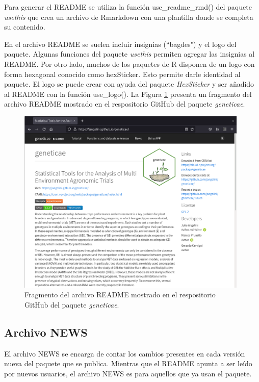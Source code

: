 Para generar el README se utiliza la función \textcolor{fandango}{use\_readme\_rmd()} del paquete \emph{usethis} que crea un archivo de Rmarkdown con una plantilla donde se completa su contenido. 

En el archivo README se suelen incluir insignias (``bagdes") y el logo del paquete. Algunas funciones del paquete \emph{usethis} permiten agregar las insignias al README. Por otro lado, muchos de los paquetes de R disponen de un logo con forma hexagonal conocido como hexSticker. Esto permite darle identidad al paquete. El logo se puede crear con ayuda del paquete \emph{HexSticker} y ser añadido al README con la función \textcolor{fandango}{use\_logo()}. La Figura \ref{fig:fig38} presenta un fragmento del archivo README mostrado en el respositorio GitHub del paquete \emph{geneticae}.

\begin{figure}[h]
	\begin{center}
		\includegraphics[width=11cm]{./Graficos/README2.png}	
	\end{center}
	\caption{Fragmento del archivo README mostrado en el respositorio GitHub del paquete \emph{geneticae}.}
	\label{fig:fig38}
\end{figure}


\subsection{Archivo NEWS}

El archivo NEWS se encarga de contar los cambios presentes en cada versión nueva del paquete que se publica. Mientras que el README apunta a ser leído por nuevos usuarios, el archivo NEWS es para aquellos que ya usan el paquete.

